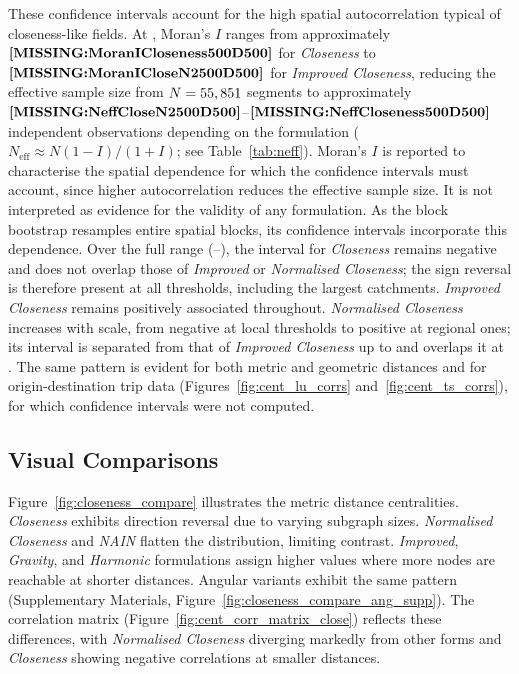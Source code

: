 These confidence intervals account for the high spatial autocorrelation typical of closeness-like fields. At , Moran's $I$ ranges from approximately $\pn{MoranICloseness500D500}$ for \emph{Closeness} to $\pn{MoranICloseN2500D500}$ for \emph{Improved Closeness}, reducing the effective sample size from $N = 55,851$ segments to approximately $\pn{NeffCloseN2500D500}$--$\pn{NeffCloseness500D500}$ independent observations depending on the formulation ($N_{\text{eff}} \approx N(1-I)/(1+I)$; see Table~\ref{tab:neff}). Moran's $I$ is reported to characterise the spatial dependence for which the confidence intervals must account, since higher autocorrelation reduces the effective sample size. It is not interpreted as evidence for the validity of any formulation. As the block bootstrap resamples entire spatial blocks, its confidence intervals incorporate this dependence. Over the full range (--), the interval for \emph{Closeness} remains negative and does not overlap those of \emph{Improved} or \emph{Normalised Closeness}; the sign reversal is therefore present at all thresholds, including the largest catchments. \emph{Improved Closeness} remains positively associated throughout. \emph{Normalised Closeness} increases with scale, from negative at local thresholds to positive at regional ones; its interval is separated from that of \emph{Improved Closeness} up to  and overlaps it at . The same pattern is evident for both metric and geometric distances and for origin-destination trip data (Figures~\ref{fig:cent_lu_corrs} and~\ref{fig:cent_ts_corrs}), for which confidence intervals were not computed.

\subsection{Visual Comparisons}

Figure~\ref{fig:closeness_compare} illustrates the  metric distance centralities. \emph{Closeness} exhibits direction reversal due to varying subgraph sizes. \emph{Normalised Closeness} and \emph{NAIN} flatten the distribution, limiting contrast. \emph{Improved}, \emph{Gravity}, and \emph{Harmonic} formulations assign higher values where more nodes are reachable at shorter distances. Angular variants exhibit the same pattern (Supplementary Materials, Figure~\ref{fig:closeness_compare_ang_supp}). The correlation matrix (Figure~\ref{fig:cent_corr_matrix_close}) reflects these differences, with \emph{Normalised Closeness} diverging markedly from other forms and \emph{Closeness} showing negative correlations at smaller distances.

